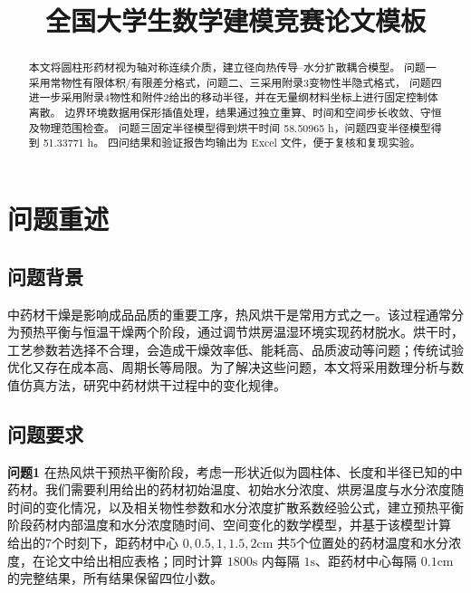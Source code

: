 \documentclass[withoutpreface,bwprint]{cumcm_thesis}
\title{全国大学生数学建模竞赛论文模板}
\begin{document}
\maketitle
\begin{abstract}
本文将圆柱形药材视为轴对称连续介质，建立径向热传导--水分扩散耦合模型。
问题一采用常物性有限体积/有限差分格式，问题二、三采用附录3变物性半隐式格式，
问题四进一步采用附录4物性和附件2给出的移动半径，并在无量纲材料坐标上进行固定控制体离散。
边界环境数据用保形插值处理，结果通过独立重算、时间和空间步长收敛、守恒及物理范围检查。
问题三固定半径模型得到烘干时间 58.50965 h，问题四变半径模型得到 51.33771 h。
四问结果和验证报告均输出为 Excel 文件，便于复核和复现实验。

\end{abstract}


\section{问题重述} %
\subsection{问题背景} %

中药材干燥是影响成品品质的重要工序，热风烘干是常用方式之一。该过程通常分为预热平衡与恒温干燥两个阶段，通过调节烘房温湿环境实现药材脱水。烘干时，工艺参数若选择不合理，会造成干燥效率低、能耗高、品质波动等问题；传统试验优化又存在成本高、周期长等局限。为了解决这些问题，本文将采用数理分析与数值仿真方法，研究中药材烘干过程中的变化规律。



\subsection{问题要求}



\textbf{问题1}  
在热风烘干预热平衡阶段，考虑一形状近似为圆柱体、长度和半径已知的中药材。我们需要利用给出的药材初始温度、初始水分浓度、烘房温度与水分浓度随时间的变化情况，以及相关物性参数和水分浓度扩散系数经验公式，建立预热平衡阶段药材内部温度和水分浓度随时间、空间变化的数学模型，并基于该模型计算 给出的7个时刻下，距药材中心 \(0,0.5,1,1.5,2\mathrm{cm}\) 共5个位置处的药材温度和水分浓度，在论文中给出相应表格；同时计算 \(1800\mathrm{s}\) 内每隔 \(1\mathrm{s}\)、距药材中心每隔 \(0.1\mathrm{cm}\) 的完整结果，所有结果保留四位小数。
\end{document}

